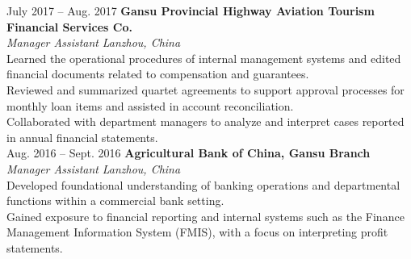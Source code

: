 \documentclass[a4paper,12pt]{article}
\begin{document}
July 2017 -- Aug. 2017 \hfill \textbf{Gansu Provincial Highway Aviation Tourism Financial Services Co.} \\ %
\textit{Manager Assistant} \hfill \textit{Lanzhou, China} \\
\textbullet Learned the operational procedures of internal management systems and edited financial documents related to compensation and guarantees. \\
\textbullet Reviewed and summarized quartet agreements to support approval processes for monthly loan items and assisted in account reconciliation. \\
\textbullet Collaborated with department managers to analyze and interpret cases reported in annual financial statements. \\


Aug. 2016 -- Sept. 2016 \hfill \textbf{Agricultural Bank of China, Gansu Branch} \\ %
\textit{Manager Assistant} \hfill \textit{Lanzhou, China} \\
\textbullet Developed foundational understanding of banking operations and departmental functions within a commercial bank setting. \\
\textbullet Gained exposure to financial reporting and internal systems such as the Finance Management Information System (FMIS), with a focus on interpreting profit statements. \\
\end{document}
